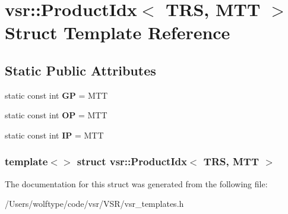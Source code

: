 \hypertarget{structvsr_1_1_product_idx_3_01_t_r_s_00_01_m_t_t_01_4}{\section{vsr\-:\-:Product\-Idx$<$ T\-R\-S, M\-T\-T $>$ Struct Template Reference}
\label{structvsr_1_1_product_idx_3_01_t_r_s_00_01_m_t_t_01_4}
}
\subsection*{Static Public Attributes}
\begin{DoxyCompactItemize}
\item 
\hypertarget{structvsr_1_1_product_idx_3_01_t_r_s_00_01_m_t_t_01_4_a26175dadc718e8243581d3bd7dec4cf1}{static const int {\bfseries G\-P} = M\-T\-T}\label{structvsr_1_1_product_idx_3_01_t_r_s_00_01_m_t_t_01_4_a26175dadc718e8243581d3bd7dec4cf1}

\item 
\hypertarget{structvsr_1_1_product_idx_3_01_t_r_s_00_01_m_t_t_01_4_aa026e7c2dd813ca6b7a08511d900fbf2}{static const int {\bfseries O\-P} = M\-T\-T}\label{structvsr_1_1_product_idx_3_01_t_r_s_00_01_m_t_t_01_4_aa026e7c2dd813ca6b7a08511d900fbf2}

\item 
\hypertarget{structvsr_1_1_product_idx_3_01_t_r_s_00_01_m_t_t_01_4_a15bd346ecd2bdaeb017884bc9d051de9}{static const int {\bfseries I\-P} = M\-T\-T}\label{structvsr_1_1_product_idx_3_01_t_r_s_00_01_m_t_t_01_4_a15bd346ecd2bdaeb017884bc9d051de9}

\end{DoxyCompactItemize}
\subsubsection*{template$<$$>$ struct vsr\-::\-Product\-Idx$<$ T\-R\-S, M\-T\-T $>$}



The documentation for this struct was generated from the following file\-:\begin{DoxyCompactItemize}
\item 
/\-Users/wolftype/code/vsr/\-V\-S\-R/vsr\-\_\-templates.\-h\end{DoxyCompactItemize}
